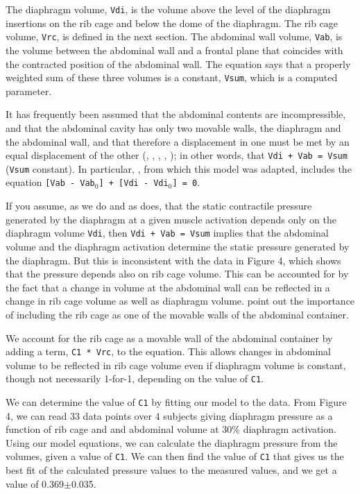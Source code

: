 \documentclass[12pt,openany,oneside]{book}
\newcommand{\ticode}[1]{\texttt{#1}}
\begin{document}
The diaphragm volume, \ticode{Vdi}, is the volume above the level of
the diaphragm insertions on the rib cage and below the dome of the
diaphragm.  The rib cage volume, \ticode{Vrc}, is defined in the next
section.  The abdominal wall volume, \ticode{Vab}, is the volume
between the abdominal wall and a frontal plane that coincides with the
contracted position of the abdominal wall.  The equation says that a
properly weighted sum of these three volumes is a constant,
\ticode{Vsum}, which is a computed parameter.

It has frequently been assumed that the abdominal contents are
incompressible, and that the abdominal cavity has only two movable
walls, the diaphragm and the abdominal wall, and that therefore a
displacement in one must be met by an equal displacement of the other
(\citet{Mead01091982}, \citet{Grassino01061978},
\citet{Grimby01111976}, \cite{Macklem01021978},
\citet{Lichtenstein01021992}); in other words, that
\ticode{Vdi + Vab = Vsum} (\ticode{Vsum} constant).  In particular,
\citet{Lichtenstein01021992}, from which this model was adapted,
includes the equation \ticode{[Vab - Vab$_0$] + [Vdi - Vdi$_0$] = 0}.

If you assume, as we do and as \citet{Lichtenstein01021992} does, that
the static contractile pressure generated by the diaphragm at a given
muscle activation depends only on the diaphragm volume \ticode{Vdi},
then \ticode{Vdi + Vab = Vsum} implies that the abdominal volume and
the diaphragm activation determine the static pressure generated by
the diaphragm.  But this is inconsistent with the data in
\citet{Grassino01061978} Figure 4, which shows that the pressure
depends also on rib cage volume.  This can be accounted for by the
fact that a change in volume at the abdominal wall can be reflected in
a change in rib cage volume as well as diaphragm volume.
\citet{Mead01091982} point out the importance of including the rib
cage as one of the movable walls of the abdominal container.

We account for the rib cage as a movable wall of the abdominal
container by adding a term, \ticode{C1 * Vrc}, to the equation.  This
allows changes in abdominal volume to be reflected in rib cage volume
even if diaphragm volume is constant, though not necessarily 1-for-1,
depending on the value of \ticode{C1}.

We can determine the value of \ticode{C1} by fitting our model to the
data.  From \citet{Grassino01061978} Figure 4, we can read 33 data
points over 4 subjects giving diaphragm pressure as a function of rib
cage and and abdominal volume at 30\% diaphragm activation.  Using our
model equations, we can calculate the diaphragm pressure from the
volumes, given a value of \ticode{C1}.  We can then find the value of
\ticode{C1} that gives us the best fit of the calculated pressure
values to the measured values, and we get a value of 0.369$\pm$0.035.
\end{document}
